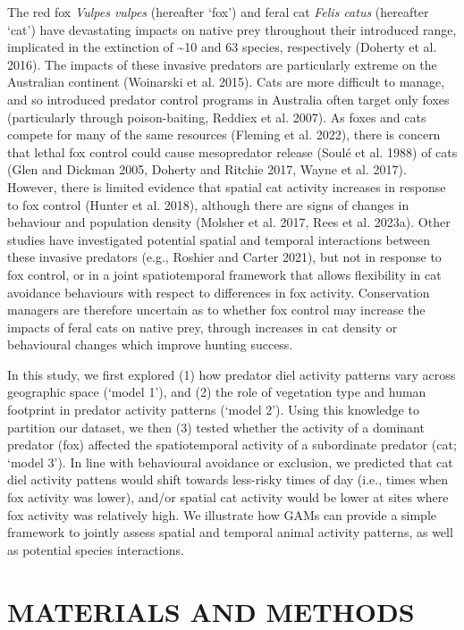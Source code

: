 \documentclass[preprint, 3p, authoryear]{elsarticle} %
\begin{document}
The red fox \emph{Vulpes vulpes} (hereafter `fox') and feral cat \emph{Felis catus} (hereafter `cat') have devastating impacts on native prey throughout their introduced range, implicated in the extinction of \textasciitilde10 and 63 species, respectively (Doherty et al. 2016). The impacts of these invasive predators are particularly extreme on the Australian continent (Woinarski et al. 2015). Cats are more difficult to manage, and so introduced predator control programs in Australia often target only foxes (particularly through poison-baiting, Reddiex et al. 2007). As foxes and cats compete for many of the same resources (Fleming et al. 2022), there is concern that lethal fox control could cause mesopredator release (Soulé et al. 1988) of cats (Glen and Dickman 2005, Doherty and Ritchie 2017, Wayne et al. 2017). However, there is limited evidence that spatial cat activity increases in response to fox control (Hunter et al. 2018), although there are signs of changes in behaviour and population density (Molsher et al. 2017, Rees et al. 2023a). Other studies have investigated potential spatial and temporal interactions between these invasive predators (e.g., Roshier and Carter 2021), but not in response to fox control, or in a joint spatiotemporal framework that allows flexibility in cat avoidance behaviours with respect to differences in fox activity. Conservation managers are therefore uncertain as to whether fox control may increase the impacts of feral cats on native prey, through increases in cat density or behavioural changes which improve hunting success.

In this study, we first explored (1) how predator diel activity patterns vary across geographic space (`model 1'), and (2) the role of vegetation type and human footprint in predator activity patterns (`model 2'). Using this knowledge to partition our dataset, we then (3) tested whether the activity of a dominant predator (fox) affected the spatiotemporal activity of a subordinate predator (cat; `model 3'). In line with behavioural avoidance or exclusion, we predicted that cat diel activity pattens would shift towards less-risky times of day (i.e., times when fox activity was lower), and/or spatial cat activity would be lower at sites where fox activity was relatively high. We illustrate how GAMs can provide a simple framework to jointly assess spatial and temporal animal activity patterns, as well as potential species interactions.

\newpage

\hypertarget{materials-and-methods}{%
\section{MATERIALS AND METHODS}\label{materials-and-methods}}
\end{document}
